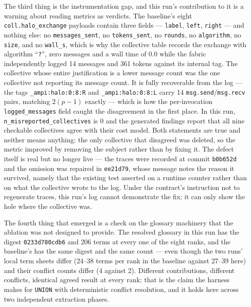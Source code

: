 \documentclass[11pt]{article}
\begin{document}
The third thing is the instrumentation gap, and this run's contribution to it is a warning about
reading metrics as verdicts. The baseline's eight \texttt{coll.halo\_exchange} payloads contain three
fields --- \texttt{label}, \texttt{left}, \texttt{right} --- and nothing else: no
\texttt{messages\_sent}, no \texttt{tokens\_sent}, no \texttt{rounds}, no \texttt{algorithm}, no
\texttt{size}, and no \texttt{wall\_s}, which is why the collective table records the exchange with
algorithm ``\texttt{?}'', zero messages and a wall time of 0.0 while the fabric independently logged
14 messages and 361 tokens against its internal tag. The collective whose entire justification is a
lower message count was the one collective not reporting its message count. It is fully recoverable
from the log --- the tags \texttt{\_ampi:halo:0:8:R} and \texttt{\_ampi:halo:0:8:L} carry 14
\texttt{msg.send}/\texttt{msg.recv} pairs, matching $2(p-1)$ exactly --- which is how the
per-invocation \texttt{logged\_messages} field caught the disagreement in the first place. In this
run, \texttt{n\_misreported\_collectives} is 0 and the generated findings report that all nine
checkable collectives agree with their cost model. Both statements are true and neither means
anything: the only collective that disagreed was deleted, so the metric improved by removing the
subject rather than by fixing it. The defect itself is real but no longer live --- the traces were
recorded at commit \texttt{b0b652d} and the omission was repaired in \texttt{ee21d79}, whose message
notes the reason it survived, namely that the existing test asserted on a runtime counter rather
than on what the collective wrote to the log. Under the contract's instruction not to regenerate
traces, this run's log cannot demonstrate the fix; it can only show the hole where the collective was.

The fourth thing that emerged is a check on the glossary machinery that the ablation was not designed
to provide. The resolved glossary in this run has the digest \texttt{0233d780cdb6} and 206 terms at
every one of the eight ranks, and the baseline's has the same digest and the same count --- even
though the two runs' local term sheets differ (24--38 terms per rank in the baseline against 27--39
here) and their conflict counts differ (4 against 2). Different contributions, different conflicts,
identical agreed result at every rank: that is the claim the harness makes for \texttt{UNION} with
deterministic conflict resolution, and it holds here across two independent extraction phases.
\end{document}
